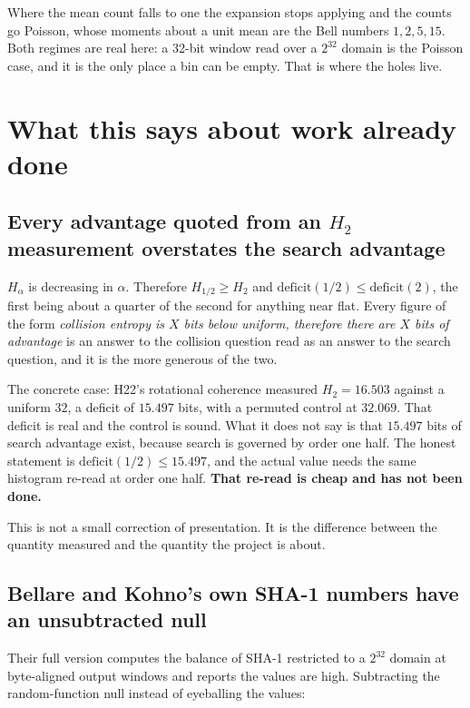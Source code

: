 Where the mean count falls to one the expansion stops applying and the counts go Poisson, whose moments about a unit mean are the Bell numbers \(1, 2, 5, 15\). Both regimes are real here: a 32-bit window read over a \(2^{32}\) domain is the Poisson case, and it is the only place a bin can be empty. That is where the holes live.

\section{What this says about work already done}

\subsection{Every advantage quoted from an \texorpdfstring{\(H_2\)}{H2} measurement overstates the search advantage}

\(H_\alpha\) is decreasing in \(\alpha\). Therefore \(H_{1/2} \ge H_2\) and \(\mathrm{deficit}(1/2) \le \mathrm{deficit}(2)\), the first being about a quarter of the second for anything near flat. Every figure of the form \emph{collision entropy is \(X\) bits below uniform, therefore there are \(X\) bits of advantage} is an answer to the collision question read as an answer to the search question, and it is the more generous of the two.

The concrete case: H22's rotational coherence measured \(H_2 = 16.503\) against a uniform \(32\), a deficit of \(15.497\) bits, with a permuted control at \(32.069\). That deficit is real and the control is sound. What it does not say is that \(15.497\) bits of search advantage exist, because search is governed by order one half. The honest statement is \(\mathrm{deficit}(1/2) \le 15.497\), and the actual value needs the same histogram re-read at order one half. \textbf{That re-read is cheap and has not been done.}

This is not a small correction of presentation. It is the difference between the quantity measured and the quantity the project is about.

\subsection{Bellare and Kohno's own SHA-1 numbers have an unsubtracted null}

Their full version computes the balance of SHA-1 restricted to a \(2^{32}\) domain at byte-aligned output windows and reports the values are high. Subtracting the random-function null instead of eyeballing the values:

